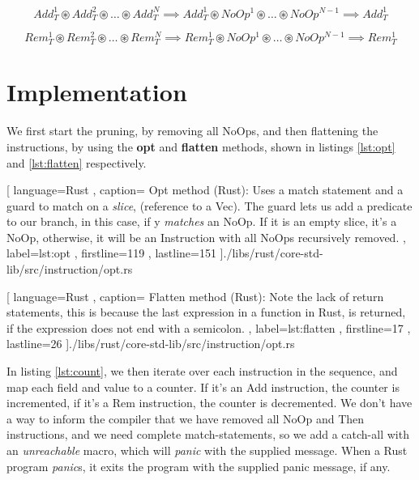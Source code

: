 \begin{equation} \label{eq:apx3}
  Add_T^1 \circledast Add_T^2 \circledast \dots \circledast Add_T^N \implies Add_T^1 \circledast NoOp^1 \circledast \dots \circledast NoOp^{N - 1} \implies Add_T^1
\end{equation}


\begin{equation} \label{eq:apx4}
  Rem_T^1 \circledast Rem_T^2 \circledast \dots \circledast Rem_T^N \implies Rem_T^1 \circledast NoOp^1 \circledast \dots \circledast NoOp^{N - 1} \implies Rem_T^1
\end{equation}


\section{Implementation}

We first start the pruning, by removing all NoOps, and then flattening the
instructions, by using the \textbf{opt} and \textbf{flatten} methods, shown in
listings \ref{lst:opt} and \ref{lst:flatten} respectively.

\begin{code}[H]
  
   [ language=Rust
   , caption={
     Opt method (Rust): Uses a match statement and a guard to match on a
     \textit{slice}, (reference to a Vec). The guard lets us add a predicate to
     our branch, in this case, if y \textit{matches} an NoOp. If it is an empty
     slice, it's a NoOp, otherwise, it will be an Instruction with all NoOps
     recursively removed.
   }
   , label=lst:opt
   , firstline=119
   , lastline=151
   ]{./libs/rust/core-std-lib/src/instruction/opt.rs}
\end{code}

\begin{code}[H]
  
   [ language=Rust
   , caption={
     Flatten method (Rust): Note the lack of return statements, this is because
     the last expression in a function in Rust, is returned, if the expression
     does not end with a semicolon.
   }
   , label=lst:flatten
   , firstline=17
   , lastline=26
   ]{./libs/rust/core-std-lib/src/instruction/opt.rs}
\end{code}

In listing \ref{lst:count}, we then iterate over each instruction in the
sequence, and map each field and value to a counter. If it's an Add
instruction, the counter is incremented, if it's a Rem instruction, the counter
is decremented. We don't have a way to inform the compiler that we have removed
all NoOp and Then instructions, and we need complete match-statements, so we add
a catch-all with an \textit{unreachable} macro, which will \textit{panic} with
the supplied message. When a Rust program \textit{panic}s, it exits the program
with the supplied panic message, if any.


